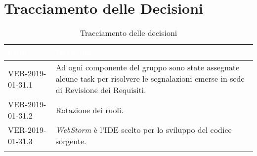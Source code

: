 
\section{Tracciamento delle Decisioni}

\begin{longtable}{|C{.40\textwidth}|C{.60\textwidth}|}
\hline
{}\textbf{\textcolor{white}{Codice}} & \textbf{\textcolor{white}{Decisione}}\\
\hline
VER-2019-01-31.1 & Ad ogni componente del gruppo sono state assegnate alcune task per risolvere 
le segnalazioni emerse in sede di Revisione dei Requisiti. \\
\hline
{}VER-2019-01-31.2 & Rotazione dei ruoli. \\
\hline
VER-2019-01-31.3 & \textit{WebStorm} è l'IDE scelto per lo sviluppo del codice sorgente. \\
\hline

\caption{Tracciamento delle decisioni}
\end{longtable}

